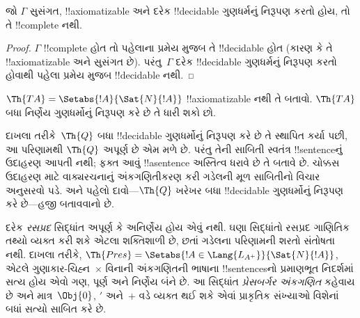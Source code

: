 \documentclass[../../../include/open-logic-section]{subfiles}
\begin{document}
\begin{cor}
જો $\Gamma$ સુસંગત, !!{axiomatizable}
અને દરેક !!{decidable} ગુણધર્મનું
નિરૂપણ કરતો હોય, તો તે
!!{complete} નથી.
\end{cor}

\begin{proof}
$\Gamma$ !!{complete} હોત તો
પહેલાના પ્રમેય મુજબ તે !!{decidable}
હોત (કારણ કે તે !!{axiomatizable}
અને સુસંગત છે). પરંતુ~$\Gamma$
દરેક !!{decidable} ગુણધર્મનું
નિરૂપણ કરતો હોવાથી પહેલા
પ્રમેય મુજબ !!{decidable} નથી.
\end{proof}

\begin{prob}
$\Th{TA} = \Setabs{!A}{\Sat{N}{!A}}$
!!{axiomatizable} નથી તે બતાવો.
$\Th{TA}$ બધા નિર્ણેય ગુણધર્મોનું
નિરૂપણ કરે છે તે ધારી શકો છો.
\end{prob}

દાખલા તરીકે~$\Th{Q}$ બધા
!!{decidable} ગુણધર્મોનું નિરૂપણ
કરે છે તે સ્થાપિત કર્યા પછી, આ પરિણામથી
$\Th{Q}$ અપૂર્ણ છે એમ મળે છે. પરંતુ તેની
સાબિતી સ્વતંત્ર !!{sentence}નું ઉદાહરણ
આપતી નથી; ફક્ત આવું !!a{sentence}
અસ્તિત્વ ધરાવે છે તે બતાવે છે. ચોક્કસ
ઉદાહરણ માટે વાક્યરચનાનું અંકગણિતીકરણ
કરી ગડેલની મૂળ સાબિતીનો વિચાર અનુસરવો
પડે. અને પહેલો દાવો—$\Th{Q}$ ખરેખર
બધા !!{decidable} ગુણધર્મોનું
નિરૂપણ કરે છે—હજી બતાવવાનો છે.

દરેક \emph{રસપ્રદ} સિદ્ધાંત અપૂર્ણ કે
અનિર્ણેય હોય એવું નથી. ઘણા સિદ્ધાંતો
રસપ્રદ ગાણિતિક તથ્યો વ્યક્ત કરી શકે
એટલા શક્તિશાળી છે, છતાં ગડેલના પરિણામની
શરતો સંતોષતા નથી. દાખલા તરીકે,
$\Th{Pres} = \Setabs{!A \in \Lang{L_{A^+}}}{\Sat{N}{!A}}$,
એટલે ગુણાકાર-ચિહ્ન~$\times$ વિનાની
અંકગણિતની ભાષાના !!{sentence}sનો
પ્રમાણભૂત નિદર્શમાં સત્ય હોય એવો ગણ,
પૂર્ણ અને નિર્ણેય બંને છે. આ સિદ્ધાંત
\emph{પ્રેસબર્ગર અંકગણિત} કહેવાય છે અને
માત્ર~$\Obj{0}$, $\prime$ અને~$+$ વડે
વ્યક્ત થઈ શકે એવાં પ્રાકૃતિક સંખ્યાઓ
વિશેનાં બધાં સત્યો સાબિત કરે છે.
\end{document}
